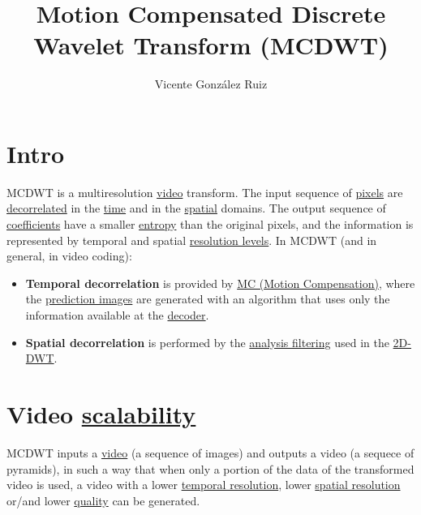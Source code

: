 
\title{Motion Compensated Discrete Wavelet Transform (MCDWT)}

\author{Vicente González Ruiz}

\maketitle
\section{Intro}

MCDWT is a multiresolution
\href{https://en.wikipedia.org/wiki/Video}{video} transform. The input
sequence of \href{https://en.wikipedia.org/wiki/Pixel}{pixels} are
\href{https://en.wikipedia.org/wiki/Decorrelation}{decorrelated} in
the \href{https://en.wikipedia.org/wiki/Time_domain}{time} and in the
\href{https://www.quora.com/What-is-spatial-domain-in-image-processing}{spatial}
domains. The output sequence of
\href{https://www.quora.com/What-is-spatial-domain-in-image-processing}{coefficients}
have a smaller \href{https://en.wikipedia.org/wiki/Entropy}{entropy}
than the original pixels, and the information is represented by
temporal and spatial
\href{https://en.wikipedia.org/wiki/Image_resolution}{resolution
  levels}. In MCDWT (and in general, in video coding):

\begin{itemize}
\item
  \textbf{Temporal decorrelation} is provided
  by \href{https://en.wikipedia.org/wiki/Motion_compensation}{MC
  (Motion Compensation)}, where
  the \href{https://en.wikipedia.org/wiki/Decoder}{prediction images}
  are generated with an algorithm that uses only the information
  available at
  the \href{https://en.wikipedia.org/wiki/Decoder}{decoder}.
\item
  \textbf{Spatial decorrelation} is performed by the
  \href{https://en.wikipedia.org/wiki/Digital_filter\#Analysis_techniques}{analysis
  filtering} used in the
  \href{https://en.wikipedia.org/wiki/Discrete_wavelet_transform}{2D-DWT}.
\end{itemize}

\section{Video \href{http://inst.eecs.berkeley.edu/~ee290t/sp04/lectures/videowavelet_UCB1-3.pdf}{scalability}}
MCDWT inputs a \href{https://en.wikipedia.org/wiki/Video}{video} (a
sequence of images) and outputs a video (a sequece of pyramids), in
such a way that when only a portion of the data of the transformed
video is used, a video with a lower
\href{https://en.wikipedia.org/wiki/Temporal_resolution}{temporal
resolution}, lower
\href{https://en.wikipedia.org/wiki/Image_resolution\#Spatial_resolution}{spatial
resolution} or/and lower
\href{https://en.wikipedia.org/wiki/Compression_artifact}{quality} can
be generated.

